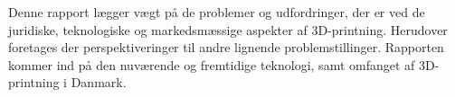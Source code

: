Denne rapport lægger vægt på de problemer og udfordringer, der er ved de juridiske, teknologiske og markedsmæssige aspekter af 3D-printning. Herudover foretages der perspektiveringer til andre lignende problemstillinger. Rapporten kommer ind på den nuværende og fremtidige teknologi, samt omfanget af 3D-printning i Danmark.